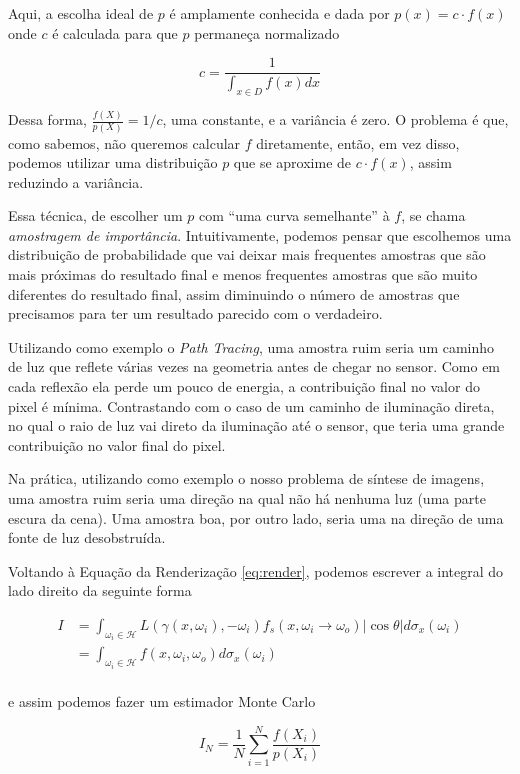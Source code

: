 Aqui, a escolha ideal de $p$ é amplamente conhecida \citep{kalos08} e dada por
$p(x) = c \cdot f(x)$ onde $c$ é calculada para que $p$ permaneça normalizado

\[
  c = \frac{1}{\int_{x \in D} f(x) dx}
\]

Dessa forma, $\frac{f(X)}{p(X)} = 1/c$, uma constante, e a variância é zero. O
problema é que, como sabemos, não queremos calcular $f$ diretamente, então, em
vez disso, podemos utilizar uma distribuição $p$ que se aproxime de $c \cdot
f(x)$, assim reduzindo a variância.

Essa técnica, de escolher um $p$ com ``uma curva semelhante'' à $f$, se chama
\emph{amostragem de importância}. Intuitivamente, podemos pensar que escolhemos
uma distribuição de probabilidade que vai deixar mais frequentes amostras que
são mais próximas do resultado final e menos frequentes amostras que são muito
diferentes do resultado final, assim diminuindo o número de amostras que
precisamos para ter um resultado parecido com o verdadeiro.

Utilizando como exemplo o \emph{Path Tracing}, uma amostra ruim seria um
caminho de luz que reflete várias vezes na geometria antes de chegar no sensor.
Como em cada reflexão ela perde um pouco de energia, a contribuição final no
valor do pixel é mínima. Contrastando com o caso de um caminho de iluminação
direta, no qual o raio de luz vai direto da iluminação até o sensor, que teria
uma grande contribuição no valor final do pixel.

Na prática, utilizando como exemplo o nosso problema de síntese de imagens, uma
amostra ruim seria uma direção na qual não há nenhuma luz (uma parte escura da
cena). Uma amostra boa, por outro lado, seria uma na direção de uma fonte de
luz desobstruída.

Voltando à Equação da Renderização \ref{eq:render}, podemos escrever a integral
do lado direito da seguinte forma

\begin{align*}
  I &=  \int_{\omega_i \in \mathcal{H}} L(\gamma(x, \omega_i), -\omega_i) f_s(x,
  \omega_i \rightarrow \omega_o) | \cos \theta | d\sigma_x(\omega_i)\\
  &= \int_{\omega_i \in \mathcal{H}} f(x, \omega_i, \omega_o) d\sigma_x(\omega_i)\\
\end{align*}

e assim podemos fazer um estimador Monte Carlo

\[
  I_N = \frac{1}{N} \sum_{i=1}^N \frac{f(X_i)}{p(X_i)}
\]

